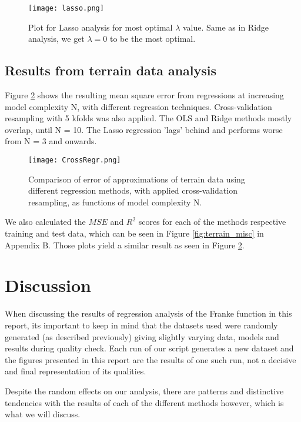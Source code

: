 \documentclass[reprint,english,notitlepage]{revtex4-1}  %
\begin{document}
\begin{figure}[h!]
    \centering
    \texttt{[image: lasso.png]}
    \caption{Plot for Lasso analysis for most optimal $\lambda$ value. Same as in Ridge analysis, we get $\lambda = 0$ to be the most optimal.}
    \label{fig:lasso}
\end{figure}

\subsection{Results from terrain data analysis}

Figure \ref{fig:terrain_analysis} shows the resulting mean square error from regressions at increasing model complexity N, with different regression techniques. Cross-validation resampling with 5 kfolds was also applied. The OLS and Ridge methods mostly overlap, until N = 10. The Lasso regression 'lags' behind and performs worse from N = 3 and onwards.

\begin{figure}[h!]
    \centering
    \texttt{[image: CrossRegr.png]}
    \caption{Comparison of error of approximations of terrain data using different regression methods, with applied cross-validation resampling, as functions of model complexity N.}
    \label{fig:terrain_analysis}
\end{figure}

We also calculated the $MSE$ and $R^2$ scores for each of the methods respective training and test data, which can be seen in Figure \ref{fig:terrain_misc} in Appendix B. Those plots yield a similar result as seen in Figure \ref{fig:terrain_analysis}.

\section{Discussion}

When discussing the results of regression analysis of the Franke function in this report, its important to keep in mind that the datasets used were randomly generated (as described previously) giving slightly varying data, models and results during quality check. Each run of our script generates a new dataset and the figures presented in this report are the results of one such run, not a decisive and final representation of its qualities.

Despite the random effects on our analysis, there are patterns and distinctive tendencies with the results of each of the different methods however, which is what we will discuss.
\end{document}
